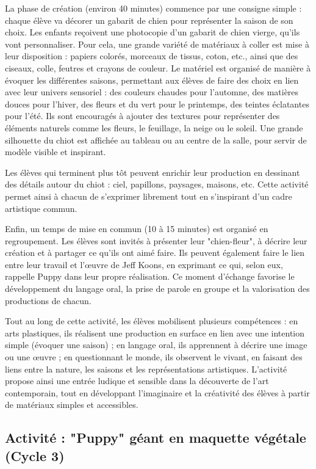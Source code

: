 \documentclass[12pt]{article}
\begin{document}
La phase de création (environ 40 minutes) commence par une consigne simple : chaque élève va décorer un gabarit de chien pour représenter la saison de son choix. Les enfants reçoivent une photocopie d’un gabarit de chien vierge, qu’ils vont personnaliser. Pour cela, une grande variété de matériaux à coller est mise à leur disposition : papiers colorés, morceaux de tissus, coton, etc., ainsi que des ciseaux, colle, feutres et crayons de couleur. Le matériel est organisé de manière à évoquer les différentes saisons, permettant aux élèves de faire des choix en lien avec leur univers sensoriel : des couleurs chaudes pour l’automne, des matières douces pour l’hiver, des fleurs et du vert pour le printemps, des teintes éclatantes pour l’été. Ils sont encouragés à ajouter des textures pour représenter des éléments naturels comme les fleurs, le feuillage, la neige ou le soleil. Une grande silhouette du chiot est affichée au tableau ou au centre de la salle, pour servir de modèle visible et inspirant.

Les élèves qui terminent plus tôt peuvent enrichir leur production en dessinant des détails autour du chiot : ciel, papillons, paysages, maisons, etc. Cette activité permet ainsi à chacun de s’exprimer librement tout en s’inspirant d’un cadre artistique commun.

Enfin, un temps de mise en commun (10 à 15 minutes) est organisé en regroupement. Les élèves sont invités à présenter leur "chien-fleur", à décrire leur création et à partager ce qu’ils ont aimé faire. Ils peuvent également faire le lien entre leur travail et l’œuvre de Jeff Koons, en exprimant ce qui, selon eux, rappelle Puppy dans leur propre réalisation. Ce moment d’échange favorise le développement du langage oral, la prise de parole en groupe et la valorisation des productions de chacun.

Tout au long de cette activité, les élèves mobilisent plusieurs compétences : en arts plastiques, ils réalisent une production en surface en lien avec une intention simple (évoquer une saison) ; en langage oral, ils apprennent à décrire une image ou une œuvre ; en questionnant le monde, ils observent le vivant, en faisant des liens entre la nature, les saisons et les représentations artistiques. L’activité propose ainsi une entrée ludique et sensible dans la découverte de l’art contemporain, tout en développant l’imaginaire et la créativité des élèves à partir de matériaux simples et accessibles.

\subsection*{Activité : "Puppy" géant en maquette végétale (Cycle 3)}
\end{document}
